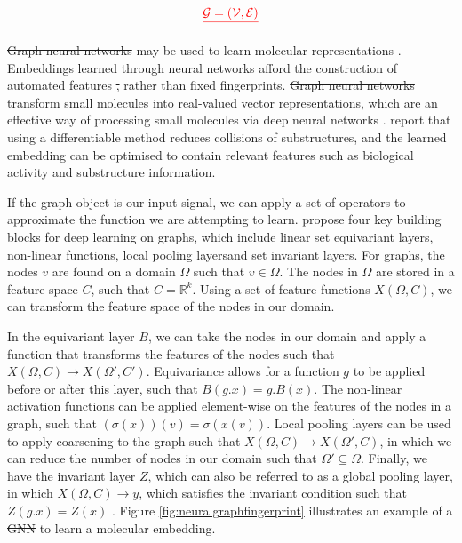 \documentclass[journal=jcisd8,manuscript=article]{achemso} %
\providecommand{\DIFadd}[1]{{\protect\color{blue}\uwave{#1}}} %
\providecommand{\DIFdel}[1]{{\protect\color{red}\sout{#1}}}                      %
\providecommand{\DIFaddbegin}{} %
\providecommand{\DIFaddend}{} %
\providecommand{\DIFdelbegin}{} %
\providecommand{\DIFdelend}{} %
\begin{document}
\DIFdelbegin \begin{displaymath}\DIFdel{\label{eq_graph}
	\mathcal{G}=(\mathcal{V}, \mathcal{E})
}\end{displaymath}%

\DIFdel{Graph neural networks }\DIFdelend \DIFaddbegin \DIFadd{Graph Convolutional Networks (GCNs) }\DIFaddend may be used to learn molecular representations \cite{jiang2021could}. Embeddings learned through neural networks afford the construction of automated features \DIFdelbegin \DIFdel{, }\DIFdelend rather than fixed fingerprints. \DIFdelbegin \DIFdel{Graph neural networks }\DIFdelend \DIFaddbegin \DIFadd{GCNs }\DIFaddend transform small molecules into real-valued vector representations, which are an effective way of processing small molecules via deep neural networks \cite{gomez2018automatic}. \citet{duvenaud2015convolutional} report that using a differentiable method reduces collisions of substructures, and the learned embedding can be optimised to contain relevant features such as biological activity and substructure information.

If the graph object is our input signal, we can apply a set of operators to approximate the function we are attempting to learn. \citet{bronstein2021geometric} propose four key building blocks for deep learning on graphs, which include linear set equivariant layers, non-linear functions, local pooling layers\DIFaddbegin \DIFadd{, }\DIFaddend and set invariant layers. For graphs, the nodes $v$ are found on a domain $\Omega$ such that $v \in \Omega$. The nodes in $\Omega$ are stored in a feature space $C$, such that $C = \mathbb{R}^k$. Using a set of feature functions $X(\Omega, C)$, we can transform the feature space of the nodes in our domain. 

In the equivariant layer $B$, we can take the nodes in our domain and apply a function that transforms the features of the nodes such that $X(\Omega, C) \rightarrow X(\Omega', C')$. Equivariance allows for a function $g$ to be applied before or after this layer, such that $B(g.x) = g.B(x)$. The non-linear activation functions can be applied element-wise on the features of the nodes in a graph, such that $(\sigma(x))(v) = \sigma(x(v))$. Local pooling layers can be used to apply coarsening to the graph such that $X(\Omega, C) \rightarrow X(\Omega', C)$, in which we can reduce the number of nodes in our domain such that $\Omega' \subseteq \Omega$. Finally, we have the invariant layer $Z$, which can also be referred to as a global pooling layer, in which $X(\Omega, C) \rightarrow y$, which satisfies the invariant condition such that $Z(g.x) = Z(x)$ \citep{bronstein2021geometric}. Figure \ref{fig:neuralgraphfingerprint} illustrates an example of a \DIFdelbegin \DIFdel{GNN }\DIFdelend \DIFaddbegin \DIFadd{GCN }\DIFaddend to learn a molecular embedding.
\end{document}
